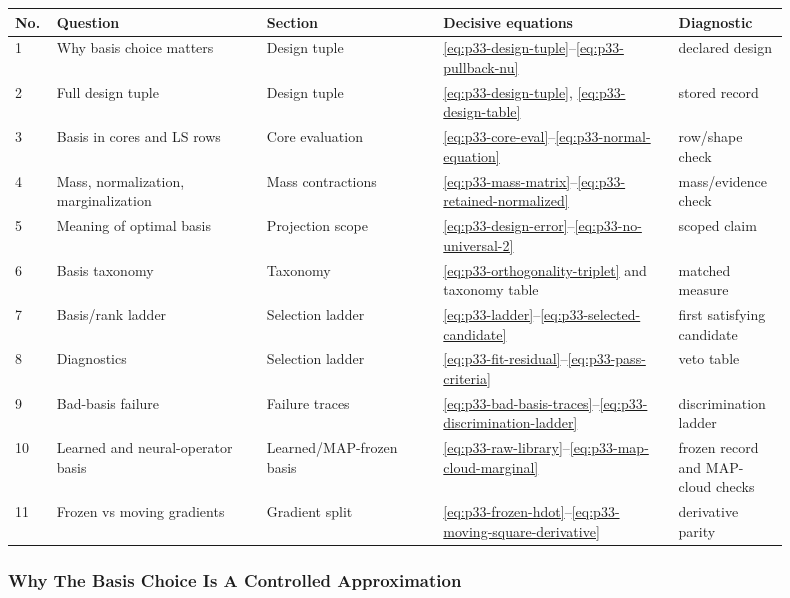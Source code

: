 \documentclass[11pt]{article}
\numberwithin{equation}{section}
\begin{document}
\begin{center}
\begin{tabular}{p{0.04\linewidth}p{0.25\linewidth}p{0.21\linewidth}p{0.28\linewidth}p{0.12\linewidth}}
\toprule
No. & Question & Section & Decisive equations & Diagnostic\\
\midrule
1 & Why basis choice matters & Design tuple & \eqref{eq:p33-design-tuple}--\eqref{eq:p33-pullback-nu} & declared design\\
2 & Full design tuple & Design tuple & \eqref{eq:p33-design-tuple}, \eqref{eq:p33-design-table} & stored record\\
3 & Basis in cores and LS rows & Core evaluation & \eqref{eq:p33-core-eval}--\eqref{eq:p33-normal-equation} & row/shape check\\
4 & Mass, normalization, marginalization & Mass contractions & \eqref{eq:p33-mass-matrix}--\eqref{eq:p33-retained-normalized} & mass/evidence check\\
5 & Meaning of optimal basis & Projection scope & \eqref{eq:p33-design-error}--\eqref{eq:p33-no-universal-2} & scoped claim\\
6 & Basis taxonomy & Taxonomy & \eqref{eq:p33-orthogonality-triplet} and taxonomy table & matched measure\\
7 & Basis/rank ladder & Selection ladder & \eqref{eq:p33-ladder}--\eqref{eq:p33-selected-candidate} & first satisfying candidate\\
8 & Diagnostics & Selection ladder & \eqref{eq:p33-fit-residual}--\eqref{eq:p33-pass-criteria} & veto table\\
9 & Bad-basis failure & Failure traces & \eqref{eq:p33-bad-basis-traces}--\eqref{eq:p33-discrimination-ladder} & discrimination ladder\\
10 & Learned and neural-operator basis & Learned/MAP-frozen basis & \eqref{eq:p33-raw-library}--\eqref{eq:p33-map-cloud-marginal} & frozen record and MAP-cloud checks\\
11 & Frozen vs moving gradients & Gradient split & \eqref{eq:p33-frozen-hdot}--\eqref{eq:p33-moving-square-derivative} & derivative parity\\
\bottomrule
\end{tabular}
\end{center}

\subsubsection{Why The Basis Choice Is A Controlled Approximation}
\end{document}
